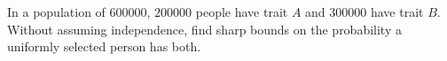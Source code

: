 In a population of $600000$, $200000$ people have trait $A$ and $300000$ have trait $B$. Without assuming independence, find sharp bounds on the probability a uniformly selected person has both.
